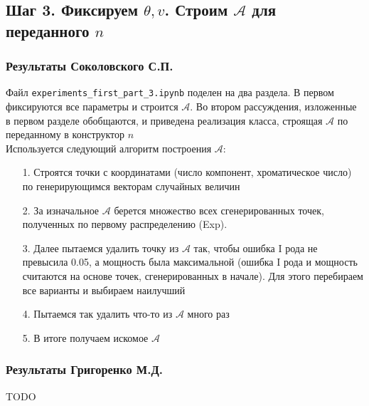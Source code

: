 \documentclass[a4paper,12pt]{article}
\begin{document}
\subsection{Шаг 3. Фиксируем $\theta, v$. Строим $\mathcal{A}$ для переданного $n$}
\subsubsection*{Результаты Соколовского С.П.}
Файл \texttt{experiments\_first\_part\_3.ipynb} поделен на два раздела. В первом фиксируются все параметры и строится $\mathcal{A}$. Во втором рассуждения, изложенные в первом разделе обобщаются, и приведена реализация класса, строящая $\mathcal{A}$ по переданному в конструктор $n$ \\
Используется следующий алгоритм построения $\mathcal{A}$:
\begin{itemize}
    \item[1.] Строятся точки с координатами (число компонент, хроматическое число) по генерирующимся векторам случайных величин
    \item[2.] За изначальное $\mathcal{A}$ берется множество всех сгенерированных точек, полученных по первому распределению (Exp).
    \item[3.] Далее пытаемся удалить точку из $\mathcal{A}$ так, чтобы ошибка I рода не превысила 0.05, а мощность была максимальной (ошибка I рода и мощность считаются на основе точек, сгенерированных в начале). Для этого перебираем все варианты и выбираем наилучший
    \item[4.] Пытаемся так удалить что-то из $\mathcal{A}$ много раз
    \item[5.] В итоге получаем искомое $\mathcal{A}$
\end{itemize}
\subsubsection*{Результаты Григоренко М.Д.}
TODO
\end{document}

